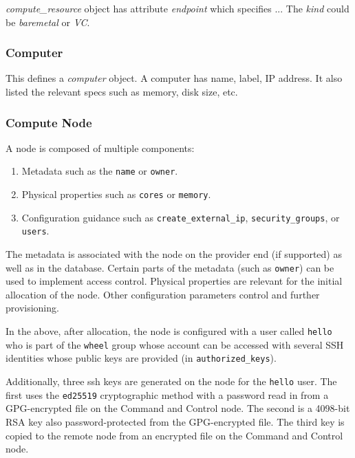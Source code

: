 \documentclass[10pt]{article}
\begin{document}
\textit{compute\_resource} object has attribute \textit{endpoint} which
specifies ... The \textit{kind} could be \textit{baremetal} or \textit{VC}.


\subsubsection{Computer}

This defines a \textit{computer} object. A computer has name, label,
IP address. It also listed the relevant specs such as memory, disk
size, etc.



\subsubsection{Compute Node}

A node is composed of multiple components:

\begin{enumerate}
\item Metadata such as the \verb|name| or \verb|owner|.
\item Physical properties such as \verb|cores| or \verb|memory|.
\item Configuration guidance such as \verb|create_external_ip|,
  \verb|security_groups|, or \verb|users|.
\end{enumerate}

The metadata is associated with the node on the provider end (if
supported) as well as in the database. Certain parts of the metadata
(such as \verb|owner|) can be used to implement access
control. Physical properties are relevant for the initial allocation
of the node. Other configuration parameters control and further
provisioning.

In the above, after allocation, the node is configured with a user
called \verb|hello| who is part of the \verb|wheel| group whose
account can be accessed with several SSH identities whose public keys
are provided (in \verb|authorized_keys|).

Additionally, three ssh keys are generated on the node for the
\verb|hello| user. The first uses the \verb|ed25519| cryptographic
method with a password read in from a GPG-encrypted file on the
Command and Control node. The second is a 4098-bit RSA key also
password-protected from the GPG-encrypted file. The third key is
copied to the remote node from an encrypted file on the Command and
Control node.
\end{document}
